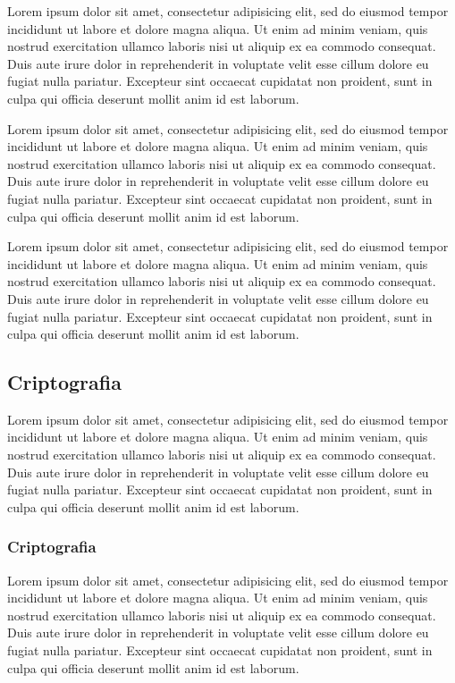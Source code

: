 \documentclass{tcc}
\begin{document}
	Lorem ipsum dolor sit amet, consectetur adipisicing elit, sed do eiusmod
	tempor incididunt ut labore et dolore magna aliqua. Ut enim ad minim veniam,
	quis nostrud exercitation ullamco laboris nisi ut aliquip ex ea commodo
	consequat. Duis aute irure dolor in reprehenderit in voluptate velit esse
	cillum dolore eu fugiat nulla pariatur. Excepteur sint occaecat cupidatat non
	proident, sunt in culpa qui officia deserunt mollit anim id est laborum.

	Lorem ipsum dolor sit amet, consectetur adipisicing elit, sed do eiusmod
	tempor incididunt ut labore et dolore magna aliqua. Ut enim ad minim veniam,
	quis nostrud exercitation ullamco laboris nisi ut aliquip ex ea commodo
	consequat. Duis aute irure dolor in reprehenderit in voluptate velit esse
	cillum dolore eu fugiat nulla pariatur. Excepteur sint occaecat cupidatat non
	proident, sunt in culpa qui officia deserunt mollit anim id est laborum.

	Lorem ipsum dolor sit amet, consectetur adipisicing elit, sed do eiusmod
	tempor incididunt ut labore et dolore magna aliqua. Ut enim ad minim veniam,
	quis nostrud exercitation ullamco laboris nisi ut aliquip ex ea commodo
	consequat. Duis aute irure dolor in reprehenderit in voluptate velit esse
	cillum dolore eu fugiat nulla pariatur. Excepteur sint occaecat cupidatat non
	proident, sunt in culpa qui officia deserunt mollit anim id est laborum.

	\subsection{Criptografia}

	Lorem ipsum dolor sit amet, consectetur adipisicing elit, sed do eiusmod
	tempor incididunt ut labore et dolore magna aliqua. Ut enim ad minim veniam,
	quis nostrud exercitation ullamco laboris nisi ut aliquip ex ea commodo
	consequat. Duis aute irure dolor in reprehenderit in voluptate velit esse
	cillum dolore eu fugiat nulla pariatur. Excepteur sint occaecat cupidatat non
	proident, sunt in culpa qui officia deserunt mollit anim id est laborum.

	\subsubsection{Criptografia}

	Lorem ipsum dolor sit amet, consectetur adipisicing elit, sed do eiusmod
	tempor incididunt ut labore et dolore magna aliqua. Ut enim ad minim veniam,
	quis nostrud exercitation ullamco laboris nisi ut aliquip ex ea commodo
	consequat. Duis aute irure dolor in reprehenderit in voluptate velit esse
	cillum dolore eu fugiat nulla pariatur. Excepteur sint occaecat cupidatat non
	proident, sunt in culpa qui officia deserunt mollit anim id est laborum.
\end{document}
